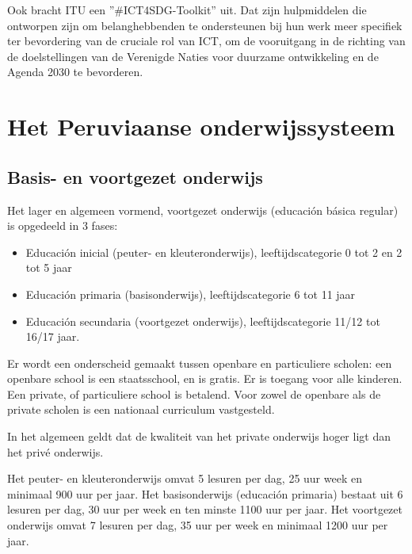 
Ook bracht ITU een ''\#ICT4SDG-Toolkit'' uit. Dat zijn hulpmiddelen die ontworpen zijn om belanghebbenden te ondersteunen bij hun werk meer specifiek ter bevordering van de cruciale rol van ICT, om de vooruitgang in de richting van de doelstellingen van de Verenigde Naties voor duurzame ontwikkeling en de Agenda 2030 te bevorderen. \autocite{ITU2015}
 
\section{Het Peruviaanse onderwijssysteem}
\subsection{Basis- en voortgezet onderwijs}
Het lager en algemeen vormend, voortgezet onderwijs (educación básica regular) is opgedeeld in 3 fases:
 \begin{itemize}
\item Educación inicial (peuter- en kleuteronderwijs), leeftijdscategorie 0 tot 2 en 2 tot 5 jaar
\item Educación primaria (basisonderwijs), leeftijdscategorie 6 tot 11 jaar
\item Educación secundaria (voortgezet onderwijs), leeftijdscategorie 11/12 tot 16/17 jaar.
\end{itemize}
Er wordt een onderscheid gemaakt tussen openbare en particuliere scholen: een openbare school is een staatsschool, en is gratis. Er is toegang voor alle kinderen. Een private, of particuliere school is betalend. Voor zowel de openbare als de private scholen is een nationaal curriculum vastgesteld.  \autocite{Nuffic2015}

In het algemeen geldt dat de kwaliteit van het private onderwijs hoger ligt dan het privé onderwijs.


Het peuter- en kleuteronderwijs omvat 5 lesuren per dag, 25 uur week en minimaal 900 uur per jaar. Het basisonderwijs (educación primaria) bestaat uit 6 lesuren per dag, 30 uur per week en ten minste 1100 uur per jaar. Het voortgezet onderwijs omvat 7 lesuren per dag, 35 uur per week en minimaal 1200 uur per jaar. \autocite{Nuffic2015}

